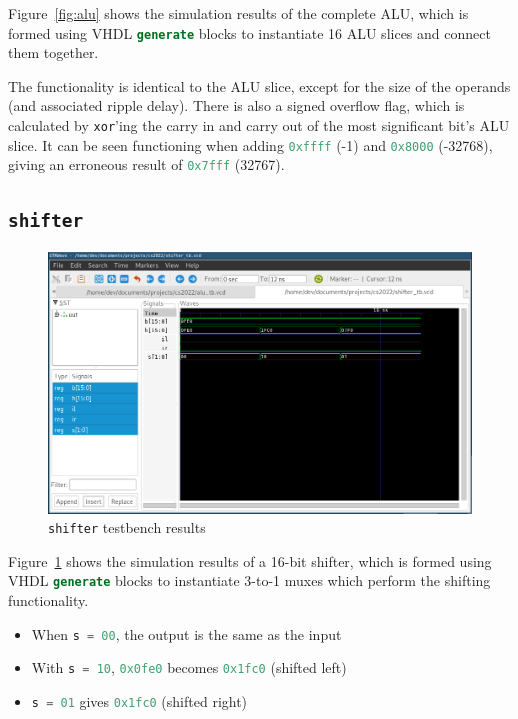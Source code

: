 \documentclass[a4paper]{article}
\numberwithin{figure}{section}
\numberwithin{table}{section}
\newcommand{\mi}{\mintinline}
\begin{document}
Figure~\ref{fig:alu} shows the simulation results of the complete ALU, which is formed
using VHDL \mi{vhdl}{generate} blocks to instantiate 16 ALU slices and connect them together.

The functionality is identical to the ALU slice, except for the size of the operands (and 
associated ripple delay). There is also a signed overflow flag, which is calculated by \mi{c}{xor}'ing 
the carry in and carry out of the most significant bit's ALU slice. It can be seen functioning when
adding \mi{c}{0xffff} (-1) and \mi{c}{0x8000} (-32768), giving an erroneous result of 
\mi{c}{0x7fff} (32767).

\newpage
\subsection{\mi{c}{shifter}}
\begin{figure}[h!]
	\centering
	\includegraphics[width=\textwidth]{shifter_tb}
	\caption{\mi{c}{shifter} testbench results}
	\label{fig:shifter}
\end{figure}

Figure~\ref{fig:shifter} shows the simulation results of a 16-bit shifter, which is formed
using VHDL \mi{vhdl}{generate} blocks to instantiate 3-to-1 muxes which perform the shifting 
functionality.
\begin{itemize}
	\item When \mi{c}{s = 00}, the output is the same as the input
	\item With \mi{c}{s = 10}, \mi{c}{0x0fe0} becomes \mi{c}{0x1fc0} (shifted left)
	\item \mi{c}{s = 01} gives \mi{c}{0x1fc0} (shifted right)
\end{itemize}
\end{document}
